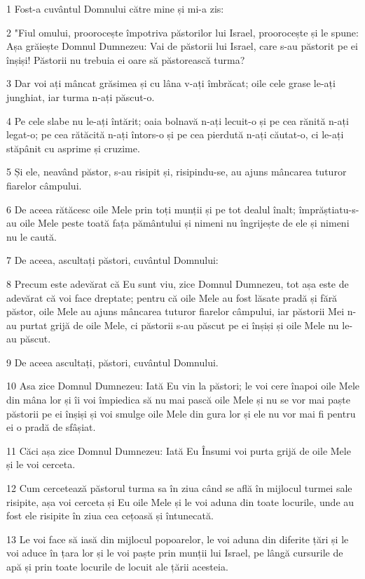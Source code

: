 \par 1 Fost-a cuvântul Domnului către mine și mi-a zis:
\par 2 "Fiul omului, proorocește împotriva păstorilor lui Israel, proorocește și le spune: Așa grăiește Domnul Dumnezeu: Vai de păstorii lui Israel, care s-au păstorit pe ei înșiși! Păstorii nu trebuia ei oare să păstorească turma?
\par 3 Dar voi ați mâncat grăsimea și cu lâna v-ați îmbrăcat; oile cele grase le-ați junghiat, iar turma n-ați păscut-o.
\par 4 Pe cele slabe nu le-ați întărit; oaia bolnavă n-ați lecuit-o și pe cea rănită n-ați legat-o; pe cea rătăcită n-ați întors-o și pe cea pierdută n-ați căutat-o, ci le-ați stăpânit cu asprime și cruzime.
\par 5 Și ele, neavând păstor, s-au risipit și, risipindu-se, au ajuns mâncarea tuturor fiarelor câmpului.
\par 6 De aceea rătăcesc oile Mele prin toți munții și pe tot dealul înalt; împrăștiatu-s-au oile Mele peste toată fața pământului și nimeni nu îngrijește de ele și nimeni nu le caută.
\par 7 De aceea, ascultați păstori, cuvântul Domnului:
\par 8 Precum este adevărat că Eu sunt viu, zice Domnul Dumnezeu, tot așa este de adevărat că voi face dreptate; pentru că oile Mele au fost lăsate pradă și fără păstor, oile Mele au ajuns mâncarea tuturor fiarelor câmpului, iar păstorii Mei n-au purtat grijă de oile Mele, ci păstorii s-au păscut pe ei înșiși și oile Mele nu le-au păscut.
\par 9 De aceea ascultați, păstori, cuvântul Domnului.
\par 10 Asa zice Domnul Dumnezeu: Iată Eu vin la păstori; le voi cere înapoi oile Mele din mâna lor și îi voi împiedica să nu mai pască oile Mele și nu se vor mai paște păstorii pe ei înșiși și voi smulge oile Mele din gura lor și ele nu vor mai fi pentru ei o pradă de sfâșiat.
\par 11 Căci așa zice Domnul Dumnezeu: Iată Eu Însumi voi purta grijă de oile Mele și le voi cerceta.
\par 12 Cum cercetează păstorul turma sa în ziua când se află în mijlocul turmei sale risipite, așa voi cerceta și Eu oile Mele și le voi aduna din toate locurile, unde au fost ele risipite în ziua cea cețoasă și întunecată.
\par 13 Le voi face să iasă din mijlocul popoarelor, le voi aduna din diferite țări și le voi aduce în țara lor și le voi paște prin munții lui Israel, pe lângă cursurile de apă și prin toate locurile de locuit ale țării acesteia.
